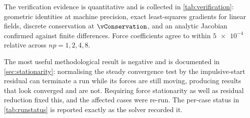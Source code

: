 The verification evidence is quantitative and is collected in
\cref{tab:verification}: geometric identities at machine precision, exact
least-squares gradients for linear fields, discrete conservation at
$\vConservation$, and an analytic Jacobian confirmed against finite differences.
Force coefficients agree to within $\num{5e-4}$ relative across $np=1,2,4,8$.

The most useful methodological result is negative and is documented in
\cref{sec:stationarity}: normalising the steady convergence test by the
impulsive-start residual can terminate a run while its forces are still moving,
producing results that look converged and are not. Requiring force stationarity as
well as residual reduction fixed this, and the affected cases were re-run. The
per-case status in \cref{tab:runstatus} is reported exactly as the solver recorded
it.
